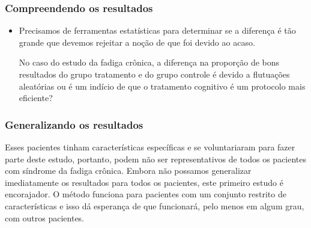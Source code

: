 \begin{frame}
\frametitle{Compreendendo os resultados}
\begin{itemize}


\justifying
\item Precisamos de ferramentas estatísticas para determinar se a diferença é tão grande que devemos rejeitar a noção de que foi devido ao acaso.

No caso do estudo da fadiga crônica, a diferença na proporção de bons resultados do grupo tratamento e do grupo controle é devido a flutuações aleatórias ou é um indício de que o tratamento cognitivo é um protocolo mais eficiente?

\end{itemize}

\end{frame}


\begin{frame}
\frametitle{Generalizando os resultados}

\justifying
{}

\pause

\justifying
Esses pacientes tinham características específicas e se voluntariaram para fazer parte deste estudo, portanto, podem não ser representativos de todos os pacientes com síndrome da fadiga crônica. Embora não possamos generalizar imediatamente os resultados para todos os pacientes, este primeiro estudo é encorajador. O método funciona para pacientes com um conjunto restrito de características e isso dá esperança de que funcionará, pelo menos em algum grau, com outros pacientes.


\end{frame}


